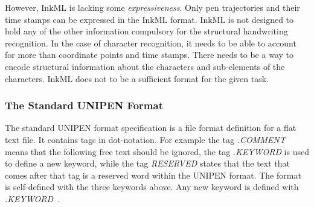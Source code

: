However, InkML is lacking some \emph{expressiveness}. Only pen trajectories and
their time stamps can be expressed in the InkML format. InkML is not designed 
to hold any of the other information compulsory for the structural handwriting
recognition. In the case of character recognition, it needs to be able to 
account for more than coordinate points and time stamps. There needs to be a 
way to encode structural information about the characters and sub-elements of 
the characters. InkML does not to be a sufficient format for the given task.

\subsubsection{The Standard UNIPEN Format}
\label{sec:hwre:standardunipenformat}

The standard UNIPEN format specification is a file format definition for a flat
text file. It contains tags in dot-notation. For example the tag \emph{.COMMENT}
means that the following free text should be ignored, the tag \emph{.KEYWORD} 
is used to define a new keyword, while the tag \emph{RESERVED} states that
the text that comes after that tag is a reserved word within the UNIPEN format.
The format is self-defined with the three keywords above. Any new keyword is
defined with \emph{.KEYWORD}~.

